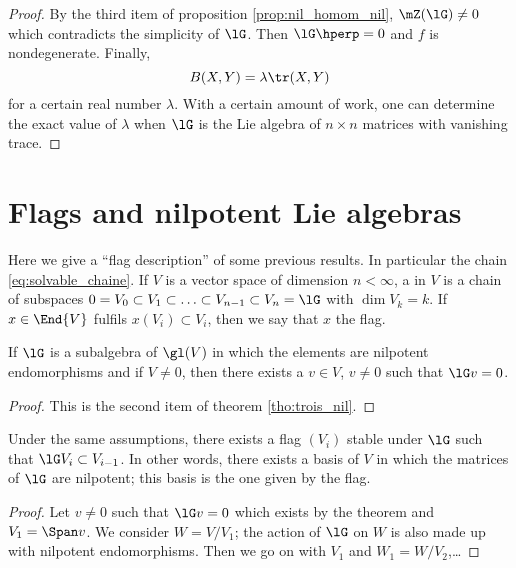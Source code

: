 \begin{proof}
    By the third item of proposition \ref{prop:nil_homom_nil}, $\mZ(\lG)\neq 0$ which contradicts the simplicity of $\lG$. Then $\lG\hperp=0$ and $f$ is nondegenerate. Finally,
    \begin{equation}
      B(X,Y)=\lambda\tr(X,Y)
    \end{equation}
    for a certain real number $\lambda$. With a certain amount of work, one can determine the exact value of $\lambda$ when $\lG$ is the Lie algebra of $n\times n$ matrices with vanishing trace.
\end{proof}

\section{Flags and nilpotent Lie algebras}

Here we give a ``flag description'' of some previous results. In particular the chain \eqref{eq:solvable_chaine}. If $V$ is a vector space of dimension $n<\infty$, a  in $V$ is a chain of subspaces $0=V_0\subset V_1\subset\ldots\subset V_{n-1}\subset V_n=\lG$ with $\dim V_k=k$. If $x\in\End{V}$ fulfils $x(V_i)\subset V_i$, then we say that $x$  the flag.

\begin{theorem}
If $\lG$ is a subalgebra of $\gl(V)$ in which the elements are nilpotent endomorphisms and if $V\neq 0$, then there exists a $v\in V$, $v\neq 0$ such that $\lG v=0$.
\end{theorem}

\begin{proof}
This is the second item of theorem \ref{tho:trois_nil}.
\end{proof}

\begin{corollary}
Under the same assumptions, there exists a flag $(V_i)$ stable under $\lG$ such that $\lG V_i\subset V_{i-1}$. In other words, there exists a basis of $V$ in which the matrices of $\lG$ are nilpotent; this basis is the one given by the flag.
\end{corollary}

\begin{proof}
Let $v\neq 0$ such that $\lG v=0$ which exists by the theorem and $V_1=\Span v$. We consider $W=V/V_1$; the action of $\lG$ on $W$ is also made up with nilpotent endomorphisms. Then we go on with $V_1$ and $W_1=W/V_2$,\dots
\end{proof}


